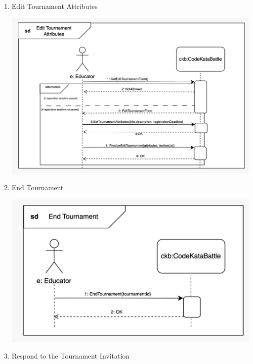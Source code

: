 \begin{enumerate}
\begin{center}
    \end{center}
    \item Edit Tournament Attributes
    \begin{center}
            \includegraphics[scale=0.2]{Images/sequence_diagrams/SD-edit_tournament_attributes.jpeg}
    \end{center}
    \item End Tournament
    \begin{center}
            \includegraphics[scale=0.2]{Images/sequence_diagrams/SD-end_tournament.jpeg}
    \end{center}
    \item Respond to the Tournament Invitation
    \begin{center}

\end{center}
\end{enumerate}
